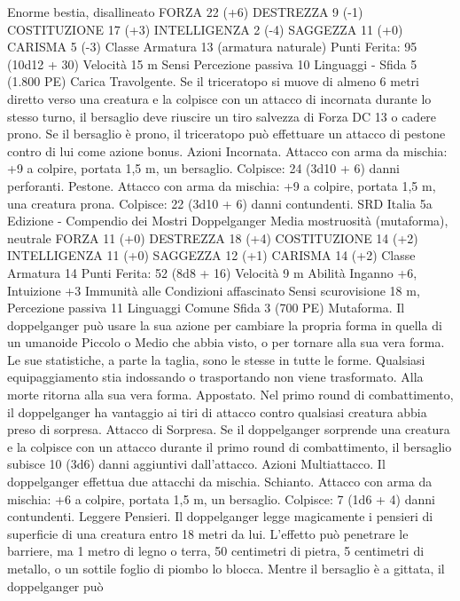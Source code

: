 \begin{multicols}{2}
Enorme bestia, disallineato
FORZA 22 (+6)
DESTREZZA 9 (-1)
COSTITUZIONE 17 (+3)
INTELLIGENZA 2 (-4)
SAGGEZZA 11 (+0)
CARISMA 5 (-3)
Classe Armatura 13 (armatura naturale)
\hspace*{0pt}\hfill{Punti Ferita}: 95 (10d12 + 30)
Velocità 15 m
Sensi Percezione passiva 10
Linguaggi -
Sfida 5 (1.800 PE)
Carica Travolgente. Se il triceratopo si muove di almeno 6 metri
diretto verso una creatura e la colpisce con un attacco di
incornata durante lo stesso turno, il bersaglio deve riuscire un
tiro salvezza di Forza DC 13 o cadere prono. Se il bersaglio è
prono, il triceratopo può effettuare un attacco di pestone contro
di lui come azione bonus.
Azioni
Incornata. Attacco con arma da mischia: +9 a colpire, portata
1,5 m, un bersaglio.
Colpisce: 24 (3d10 + 6) danni perforanti.
Pestone. Attacco con arma da mischia: +9 a colpire, portata 1,5
m, una creatura prona.
Colpisce: 22 (3d10 + 6) danni contundenti.
SRD Italia 5a Edizione - Compendio dei Mostri
Doppelganger
Media mostruosità (mutaforma), neutrale
FORZA 11 (+0)
DESTREZZA 18 (+4)
COSTITUZIONE 14 (+2)
INTELLIGENZA 11 (+0)
SAGGEZZA 12 (+1)
CARISMA 14 (+2)
Classe Armatura 14
\hspace*{0pt}\hfill{Punti Ferita}: 52 (8d8 + 16)
Velocità 9 m
Abilità Inganno +6, Intuizione +3
Immunità alle Condizioni affascinato
Sensi scurovisione 18 m, Percezione passiva 11
Linguaggi Comune
Sfida 3 (700 PE)
Mutaforma. Il doppelganger può usare la sua azione per
cambiare la propria forma in quella di un umanoide Piccolo o
Medio che abbia visto, o per tornare alla sua vera forma. Le sue
statistiche, a parte la taglia, sono le stesse in tutte le forme.
Qualsiasi equipaggiamento stia indossando o trasportando non
viene trasformato. Alla morte ritorna alla sua vera forma.
Appostato. Nel primo round di combattimento, il doppelganger
ha vantaggio ai tiri di attacco contro qualsiasi creatura abbia
preso di sorpresa.
Attacco di Sorpresa. Se il doppelganger sorprende una creatura e
la colpisce con un attacco durante il primo round di
combattimento, il bersaglio subisce 10 (3d6) danni aggiuntivi
dall’attacco.
Azioni
Multiattacco. Il doppelganger effettua due attacchi da mischia.
Schianto. Attacco con arma da mischia: +6 a colpire, portata 1,5
m, un bersaglio.
Colpisce: 7 (1d6 + 4) danni contundenti.
Leggere Pensieri. Il doppelganger legge magicamente i pensieri
di superficie di una creatura entro 18 metri da lui. L’effetto può
penetrare le barriere, ma 1 metro di legno o terra, 50 centimetri
di pietra, 5 centimetri di metallo, o un sottile foglio di piombo lo
blocca. Mentre il bersaglio è a gittata, il doppelganger può

\end{multicols}
